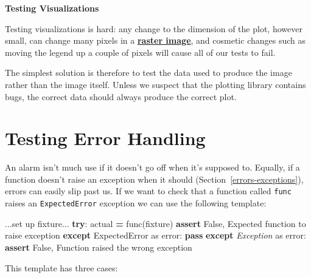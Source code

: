 \documentclass[
]{krantz}
\makeatletter
\newenvironment{Shaded}{\begin{snugshade}}{\end{snugshade}}
\newcommand{\BuiltInTok}[1]{#1}
\newcommand{\ControlFlowTok}[1]{\textcolor[rgb]{0.13,0.29,0.53}{\textbf{#1}}}
\newcommand{\ImportTok}[1]{#1}
\newcommand{\NormalTok}[1]{#1}
\newcommand{\OperatorTok}[1]{\textcolor[rgb]{0.81,0.36,0.00}{\textbf{#1}}}
\newcommand{\PreprocessorTok}[1]{\textcolor[rgb]{0.56,0.35,0.01}{\textit{#1}}}
\newcommand{\StringTok}[1]{\textcolor[rgb]{0.31,0.60,0.02}{#1}}
\newcommand{\VariableTok}[1]{\textcolor[rgb]{0.00,0.00,0.00}{#1}}
\renewenvironment{quote}{\begin{VF}}{\end{VF}}
\newenvironment{kframe}{%
\medskip{}
\setlength{\fboxsep}{.8em}
 \def\at@end@of@kframe{}%
 \ifinner\ifhmode%
  \def\at@end@of@kframe{\end{minipage}}%
  \begin{minipage}{\columnwidth}%
 \fi\fi%
 \def\FrameCommand##1{\hskip\@totalleftmargin \hskip-\fboxsep
 \colorbox{shadecolor}{##1}\hskip-\fboxsep
     \hskip-\linewidth \hskip-\@totalleftmargin \hskip\columnwidth}%
 \MakeFramed {\advance\hsize-\width
   \@totalleftmargin\z@ \linewidth\hsize
   \@setminipage}}%
 {\par\unskip\endMakeFramed%
 \at@end@of@kframe}
\renewenvironment{Shaded}{\begin{kframe}}{\end{kframe}}
\newcommand{\gref}[2]{\hyperlink{#2}{\textbf{#1}}}
\makeatother
\begin{document}
\begin{quote}
\textbf{Testing Visualizations}

Testing visualizations is hard:
any change to the dimension of the plot,
however small,
can change many pixels in a \gref{raster image}{raster\_image},
and cosmetic changes such as moving the legend up a couple of pixels
will cause all of our tests to fail.

The simplest solution is therefore to test the data used to produce the image
rather than the image itself.
Unless we suspect that the plotting library contains bugs,
the correct data should always produce the correct plot.
\end{quote}

\hypertarget{testing-failure}{%
\section{Testing Error Handling}\label{testing-failure}}

An alarm isn't much use if it doesn't go off when it's supposed to.
Equally,
if a function doesn't raise an exception when it should (Section~\ref{errors-exceptions}),
errors can easily slip past us.
If we want to check that a function called \texttt{func} raises an \texttt{ExpectedError} exception
we can use the following template:

\begin{Shaded}
\begin{Highlighting}[]
\NormalTok{...}\BuiltInTok{set}\NormalTok{ up fixture...}
\ControlFlowTok{try}\NormalTok{:}
\NormalTok{    actual }\OperatorTok{=}\NormalTok{ func(fixture)}
    \ControlFlowTok{assert} \VariableTok{False}\NormalTok{, }\StringTok{\textquotesingle{}Expected function to raise exception\textquotesingle{}}
\ControlFlowTok{except}\NormalTok{ ExpectedError }\ImportTok{as}\NormalTok{ error:}
    \ControlFlowTok{pass}
\ControlFlowTok{except} \PreprocessorTok{Exception} \ImportTok{as}\NormalTok{ error:}
    \ControlFlowTok{assert} \VariableTok{False}\NormalTok{, }\StringTok{\textquotesingle{}Function raised the wrong exception\textquotesingle{}}
\end{Highlighting}
\end{Shaded}

This template has three cases:
\end{document}
